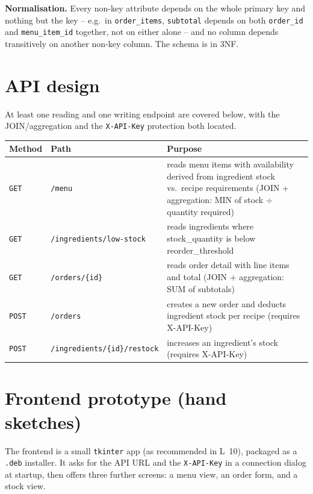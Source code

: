 \documentclass[11pt,a4paper]{article}
\begin{document}
\textbf{Normalisation.} Every non-key attribute depends on the whole
primary key and nothing but the key -- e.g.\ in \texttt{order\_items},
\texttt{subtotal} depends on both \texttt{order\_id} and
\texttt{menu\_item\_id} together, not on either alone -- and no column
depends transitively on another non-key column. The schema is in 3NF.

\section{API design}

At least one reading and one writing endpoint are covered below, with the
JOIN/aggregation and the \texttt{X-API-Key} protection both located.

\renewcommand{\arraystretch}{1.2}
\begin{tabularx}{\linewidth}{@{}p{2.2cm}p{4.6cm}X@{}}
\toprule
\textbf{Method} & \textbf{Path} & \textbf{Purpose} \\
\midrule
\texttt{GET}  & \texttt{/menu} & reads menu items with availability derived from ingredient stock vs.\ recipe requirements (JOIN + aggregation: MIN of stock $\div$ quantity required) \\
\texttt{GET}  & \texttt{/ingredients/low-stock} & reads ingredients where stock\_quantity is below reorder\_threshold \\
\texttt{GET}  & \texttt{/orders/\{id\}} & reads order detail with line items and total (JOIN + aggregation: SUM of subtotals) \\
\texttt{POST} & \texttt{/orders} & creates a new order and deducts ingredient stock per recipe (requires X-API-Key) \\
\texttt{POST} & \texttt{/ingredients/\{id\}/restock} & increases an ingredient's stock (requires X-API-Key) \\
\bottomrule
\end{tabularx}

\section{Frontend prototype (hand sketches)}

The frontend is a small \texttt{tkinter} app (as recommended in L~10),
packaged as a \texttt{.deb} installer. It asks for the API URL and the
\texttt{X-API-Key} in a connection dialog at startup, then offers three
further screens: a menu view, an order form, and a stock view.
\end{document}
